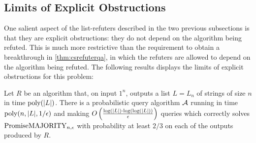 
\subsection{Limits of Explicit Obstructions}

One salient aspect of the list-refuters described 
in the two previous subsections is that they are explicit
obstructions: they do not depend on the algorithm being refuted. 
This is much more restrictive than the requirement to obtain
a breakthrough in \cref{thm:csrefuterqa}, in which the refuters are allowed to
depend on the algorithm being refuted. The following results displays
the limits of explicit obstructions for this problem:

\begin{theorem}
    \label{thm:explicitlimits}
Let $R$ be an algorithm that, on input $1^n$, outputs a list $L = L_n$ of strings of size $n$ in time $\text{poly}(|L|)$.
There is a probabilistic query algorithm $\mathcal{A}$ running in time $\text{poly}(n, |L|, 1/\epsilon)$ and making $O\left(\frac{\log (|L|) \cdot \log (\log (|L|))}{\epsilon}\right)$ queries
which correctly solves $\mathrm{PromiseMAJORITY}_{n, \epsilon}$ with probability at least $2/3$ on each of the outputs produced by $R$.
\end{theorem}
